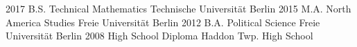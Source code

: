%


\vspace{-10 pt}
\begin{entrylist}
    \entry
		{2017}
		{B.S. Technical Mathematics}
		{Technische Universität Berlin}
		{}
    \entry
		{2015}
    {M.A. North America Studies}
		{Freie Universität Berlin}
		{}
	\entry
		{2012}
    {B.A. Political Science}
		{Freie Universität Berlin}
		{}
	\entry
		{2008}
    {High School Diploma}
		{Haddon Twp. High School}
		{}
\end{entrylist}
